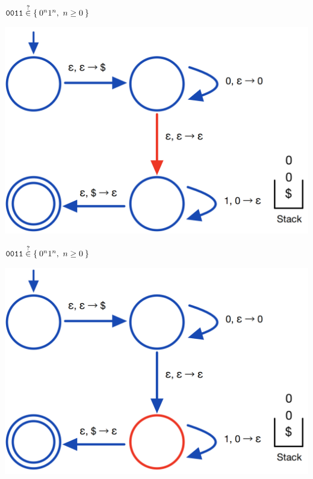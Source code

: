 \documentclass[aspectratio=169]{beamer}
\begin{document}
\begin{frame}{$\texttt{0011} \stackrel{?}{\in} \Set{0^n 1^n,\ n \geq 0}$}
    \begin{center}
        \includegraphics[scale=0.30]{images/pda_comp/PDA_Comp_8.png}
    \end{center}
\end{frame}

\begin{frame}{$\texttt{0011} \stackrel{?}{\in} \Set{0^n 1^n,\ n \geq 0}$}
    \begin{center}
        \includegraphics[scale=0.30]{images/pda_comp/PDA_Comp_9.png}
    \end{center}
\end{frame}
\end{document}

